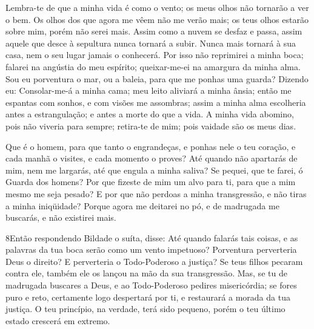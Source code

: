 Lembra-te de que a minha vida é como o vento; os meus olhos não
tornarão a ver o bem. Os olhos dos que agora me vêem não me
verão mais; os teus olhos estarão sobre mim, porém não serei mais.
Assim como a nuvem se desfaz e passa, assim aquele que desce à
sepultura nunca tornará a subir. Nunca mais tornará à sua
casa, nem o seu lugar jamais o conhecerá. Por isso não
reprimirei a minha boca; falarei na angústia do meu espírito;
queixar-me-ei na amargura da minha alma. Sou eu porventura o
mar, ou a baleia, para que me ponhas uma guarda? Dizendo eu:
Consolar-me-á a minha cama; meu leito aliviará a minha ânsia;
então me espantas com sonhos, e com visões me assombras;
assim a minha alma escolheria antes a estrangulação; e antes
a morte do que a vida. A minha vida abomino, pois não viveria
para sempre; retira-te de mim; pois vaidade são os meus dias.

Que é o homem, para que tanto o engrandeças, e ponhas nele o teu
coração, e cada manhã o visites, e cada momento o proves?
Até quando não apartarás de mim, nem me largarás, até que
engula a minha saliva? Se pequei, que te farei, ó Guarda dos
homens? Por que fizeste de mim um alvo para ti, para que a mim mesmo
me seja pesado? E por que não perdoas a minha transgressão, e
não tiras a minha iniqüidade? Porque agora me deitarei no pó, e de
madrugada me buscarás, e não existirei mais.

\medskip

\lettrine{8} Então respondendo Bildade o suíta, disse: Até
quando falarás tais coisas, e as palavras da tua boca serão como um
vento impetuoso? Porventura perverteria Deus o direito? E
perverteria o Todo-Poderoso a justiça? Se teus filhos pecaram
contra ele, também ele os lançou na mão da sua transgressão.
Mas, se tu de madrugada buscares a Deus, e ao Todo-Poderoso
pedires misericórdia; se fores puro e reto, certamente logo
despertará por ti, e restaurará a morada da tua justiça. O teu
princípio, na verdade, terá sido pequeno, porém o teu último estado
crescerá em extremo.

